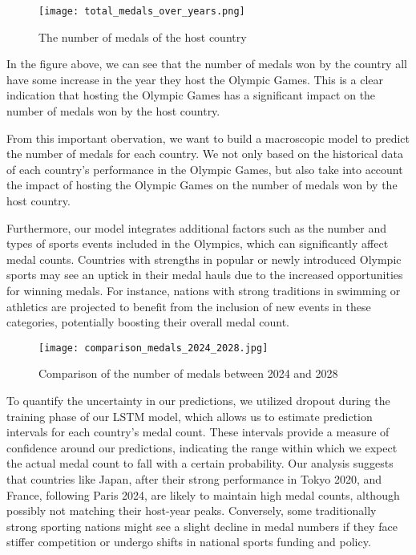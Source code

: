 \documentclass[12pt]{article}
\begin{document}

\begin{figure}[H]
    \centering
    \texttt{[image: total\_medals\_over\_years.png]}
    \caption{The number of medals of the host country}
    \label{fig:1}
\end{figure}

In the figure above, we can see that the number of medals won by the country all have some increase in the year they host the Olympic Games. This is a clear indication that hosting the Olympic Games has a significant impact on the number of medals won by the host country.

From this important obervation, we want to build a macroscopic model to predict the number of medals for each country. We not only based on the historical data of each country's performance in the Olympic Games, but also take into account the impact of hosting the Olympic Games on the number of medals won by the host country.

Furthermore, our model integrates additional factors such as the number and types of sports events included in the Olympics, which can significantly affect medal counts. Countries with strengths in popular or newly introduced Olympic sports may see an uptick in their medal hauls due to the increased opportunities for winning medals. For instance, nations with strong traditions in swimming or athletics are projected to benefit from the inclusion of new events in these categories, potentially boosting their overall medal count.

\begin{figure}[H]
    \centering
    \texttt{[image: comparison\_medals\_2024\_2028.jpg]}
    \caption{Comparison of the number of medals between 2024 and 2028}
    \label{fig:2}
\end{figure}

To quantify the uncertainty in our predictions, we utilized dropout during the training phase of our LSTM model, which allows us to estimate prediction intervals for each country's medal count. These intervals provide a measure of confidence around our predictions, indicating the range within which we expect the actual medal count to fall with a certain probability. Our analysis suggests that countries like Japan, after their strong performance in Tokyo 2020, and France, following Paris 2024, are likely to maintain high medal counts, although possibly not matching their host-year peaks. Conversely, some traditionally strong sporting nations might see a slight decline in medal numbers if they face stiffer competition or undergo shifts in national sports funding and policy.
\end{document}
